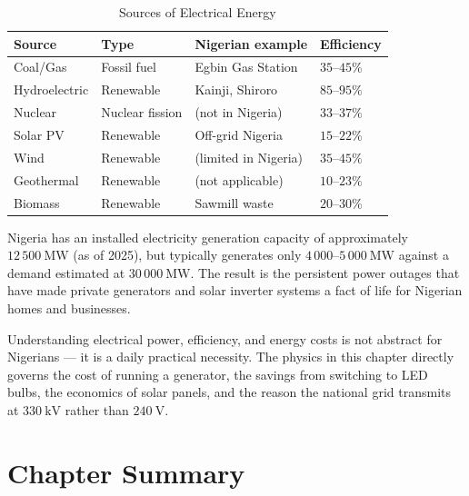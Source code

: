 \begin{table}[H]
\centering
\caption{Sources of Electrical Energy}
\label{tab:energy_sources}
\begin{tabular}{llll}
\toprule
\textbf{Source} & \textbf{Type} & \textbf{Nigerian
example} & \textbf{Efficiency}\\
\midrule
Coal/Gas & Fossil fuel & Egbin Gas Station & $35$--$45\%$\\
Hydroelectric & Renewable & Kainji, Shiroro & $85$--$95\%$\\
Nuclear & Nuclear fission & (not in Nigeria) & $33$--$37\%$\\
Solar PV & Renewable & Off-grid Nigeria & $15$--$22\%$\\
Wind & Renewable & (limited in Nigeria) & $35$--$45\%$\\
Geothermal & Renewable & (not applicable) & $10$--$23\%$\\
Biomass & Renewable & Sawmill waste & $20$--$30\%$\\
\bottomrule
\end{tabular}
\end{table}

\begin{realworldbox}
Nigeria has an installed electricity generation
capacity of approximately $12\,500\ \text{MW}$
(as of 2025), but typically generates only
$4\,000$--$5\,000\ \text{MW}$ against a demand
estimated at $30\,000\ \text{MW}$. The result is
the persistent power outages that have made private
generators and solar inverter systems a fact of
life for Nigerian homes and businesses.

Understanding electrical power, efficiency, and
energy costs is not abstract for Nigerians --- it
is a daily practical necessity. The physics in
this chapter directly governs the cost of running
a generator, the savings from switching to LED
bulbs, the economics of solar panels, and the
reason the national grid transmits at $330\ \text{kV}$
rather than $240\ \text{V}$.
\end{realworldbox}

\section{Chapter Summary}

